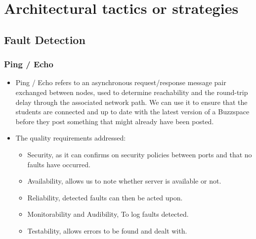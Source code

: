 \documentclass[12pt, oneside]{article}
\begin{document}
\section{Architectural tactics or strategies}

	
	
	\subsection{Fault Detection}
		\subsubsection{Ping / Echo}			
			\begin{itemize}		
				\item Ping / Echo refers to an asynchronous request/response message pair exchanged between nodes, used to determine reachability and the round-trip delay through the associated network path. We can use it to ensure that the students are connected and up to date with the latest version of a Buzzspace before they post something that might already have been posted.
				\item The quality requirements addressed:
					\begin{itemize}
						\item Security, as it can confirms on security policies between ports and that no faults have occurred.
						\item Availability, allows us to note whether server is available or not.
						\item Reliability, detected faults can then be acted upon. 
						\item Monitorability and Audibility, To log faults detected.
						\item Testability, allows errors to be found and dealt with.
					\end{itemize}
			\end{itemize}
			
\end{document}
